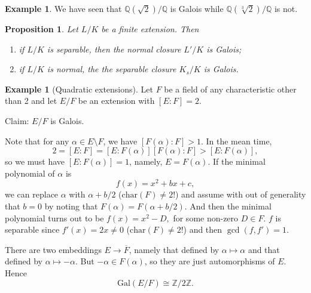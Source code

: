 \documentclass[12pt]{report}
\newtheorem{prop}[thm]{Proposition}
{\theoremstyle{remark}\newtheorem*{remark}{Remark}}
\theoremstyle{definition}
\newtheorem{example}[thm]{Example}
\def\ZZ{\mathbb{Z}}
\def\QQ{\mathbb{Q}}
\def\aa{\alpha}
\def\Gal{\text{Gal}}
\def\char{\text{char}}
\begin{document}
\begin{example}
    We have seen that $\QQ(\sqrt{2})/\QQ$ is Galois while $\QQ(\sqrt[3]{2})/\QQ$ is not.
\end{example}

\begin{prop}
    Let $L/K$ be a finite extension. Then
    \begin{enumerate}
        \item if $L/K$ is separable, then the normal closure $L'/K$ is Galois;
        \item if $L/K$ is normal, the the separable closure $K_s/K$ is Galois.
    \end{enumerate}
\end{prop}

\begin{example}[Quadratic extensions]
    Let $F$ be a field of any characteristic other than 2 and let $E/F$ be an extension with $[E:F]=2$.

    Claim: $E/F$ is Galois.

    Note that for any $\aa\in E\setminus F$, we have $[F(\aa):F] > 1$. In the mean time, $$2 = [E:F]=[E:F(\aa)][F(\aa):F] > [E:F(\aa)],$$ so we must have $[E:F(\aa)]=1$, namely, $E=F(\aa)$. If the minimal polynomial of $\aa$ is $$f(x)=x^2+bx+c,$$ we can replace $\aa$ with $\aa+b/2$ ($\char(F)\not=2$!) and assume with out of generality that $b=0$ by noting that $F(\aa)=F(\aa+b/2)$. And then the minimal polynomial turns out to be $f(x)=x^2-D,$ for some non-zero $D\in F$. $f$ is separable since $f'(x)=2x\not=0$ ($\char(F)\not=2$!) and then $\gcd(f,f')=1$.

    There are two embeddings $E\to \overline{F}$, namely that defined by $\aa\mapsto\aa$ and that defined by $\aa\mapsto -\aa$. But $-\aa\in F(\aa)$, so they are just automorphisms of $E$. Hence $$\Gal(E/F)\cong \ZZ/2\ZZ.$$
\end{example}
\end{document}
